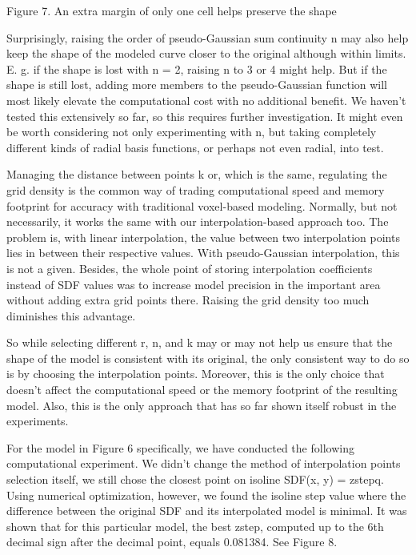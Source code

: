 \documentclass[12pt,a4paper]{article}
\begin{document}
\par
Figure 7. An extra margin of only one cell helps preserve the shape
\par
Surprisingly, raising the order of pseudo-Gaussian sum continuity n may also help keep the shape of the modeled curve closer to the original although within limits. E. g. if the shape is lost with n = 2, raising n to 3 or 4 might help. But if the shape is still lost, adding more members to the pseudo-Gaussian function will most likely elevate the computational cost with no additional benefit. We haven’t tested this extensively so far, so this requires further investigation. It might even be worth considering not only experimenting with n, but taking completely different kinds of radial basis functions, or perhaps not even radial, into test.
\par
Managing the distance between points k or, which is the same, regulating the grid density is the common way of trading computational speed and memory footprint for accuracy with traditional voxel-based modeling. Normally, but not necessarily, it works the same with our interpolation-based approach too. The problem is, with linear interpolation, the value between two interpolation points lies in between their respective values. With pseudo-Gaussian interpolation, this is not a given. Besides, the whole point of storing interpolation coefficients instead of SDF values was to increase model precision in the important area without adding extra grid points there. Raising the grid density too much diminishes this advantage.
\par
So while selecting different r, n, and k may or may not help us ensure that the shape of the model is consistent with its original, the only consistent way to do so is by choosing the interpolation points. Moreover, this is the only choice that doesn’t affect the computational speed or the memory footprint of the resulting model. Also, this is the only approach that has so far shown itself robust in the experiments.
\par
For the model in Figure 6 specifically, we have conducted the following computational experiment. We didn’t change the method of interpolation points selection itself, we still chose the closest point on isoline SDF(x, y) = zstepq. Using numerical optimization, however, we found the isoline step value where the difference between the original SDF and its interpolated model is minimal. It was shown that for this particular model, the best zstep, computed up to the 6th decimal sign after the decimal point, equals 0.081384. See Figure 8.
\end{document}
